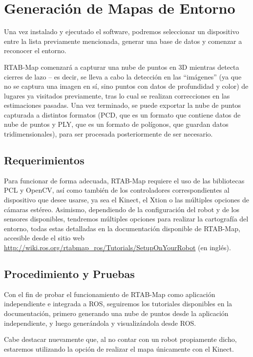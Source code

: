 \section{Generación de Mapas de Entorno}
\label{sec:genenvironmentmaps}

Una vez instalado y ejecutado el software, podremos seleccionar un dispositivo entre la lista previamente mencionada, generar una base de datos y comenzar a reconocer el entorno.

RTAB-Map comenzará a capturar una nube de puntos en 3D mientras detecta cierres de lazo -- es decir, se lleva a cabo la detección en las ``imágenes'' (ya que no se captura una imagen en sí, sino puntos con datos de profundidad y color) de lugares ya visitados previamente, tras lo cual se realizan correcciones en las estimaciones pasadas. Una vez terminado, se puede exportar la nube de puntos capturada a distintos formatos (PCD, que es un formato que contiene datos de nube de puntos \cite{pcdformat} y PLY, que es un formato de polígonos, que guardan datos tridimensionales), para ser procesada posteriormente de ser necesario.

\subsection{Requerimientos}

Para funcionar de forma adecuada, RTAB-Map requiere el uso de las bibliotecas PCL y OpenCV, así como también de los controladores correspondientes al dispositivo que desee usarse, ya sea el Kinect, el Xtion o las múltiples opciones de cámaras estéreo. Asimismo, dependiendo de la configuración del robot y de los sensores disponibles, tendremos múltiples opciones para realizar la cartografía del entorno, todas estas detalladas en la documentación disponible de RTAB-Map, accesible desde el sitio web \url{http://wiki.ros.org/rtabmap_ros/Tutorials/SetupOnYourRobot} (en inglés).

\subsection{Procedimiento y Pruebas}

Con el fin de probar el funcionamiento de RTAB-Map como aplicación independiente e integrada a ROS, seguiremos los tutoriales disponibles en la documentación, primero generando una nube de puntos desde la aplicación independiente, y luego generándola y visualizándola desde ROS.

Cabe destacar nuevamente que, al no contar con un robot propiamente dicho, estaremos utilizando la opción de realizar el mapa únicamente con el Kinect.

